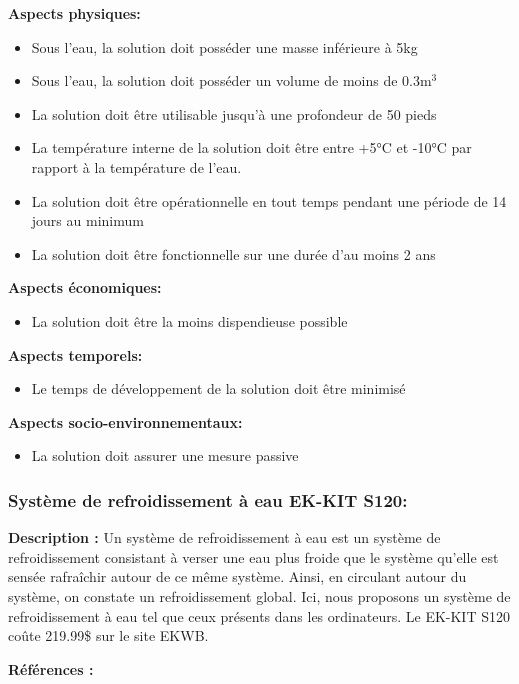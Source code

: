 \textbf{Aspects physiques:}
\begin{itemize}[label = {--}]
    \item Sous l'eau, la solution doit posséder une masse inférieure à 5kg
    \item Sous l'eau, la solution doit posséder un volume de moins de 0.3m$^3$
    \item La solution doit être utilisable jusqu'à une profondeur de 50 pieds
    \item La température interne de la solution doit être entre +5°C et -10°C par rapport à la température de l'eau.
    \item La solution doit être opérationnelle en tout temps pendant une période de 14 jours au minimum
    \item La solution doit être fonctionnelle sur une durée d'au moins 2 ans
\end{itemize}

\textbf{Aspects économiques:}
\begin{itemize}[label = {--}]
    \item La solution doit être la moins dispendieuse possible
\end{itemize}

\textbf{Aspects temporels:}
\begin{itemize}[label = {--}]
    \item Le temps de développement de la solution doit être minimisé
\end{itemize}

\textbf{Aspects socio-environnementaux:}
\begin{itemize}[label = {--}]
    \item La solution doit assurer une mesure passive
\end{itemize}

\subsubsection{Système de refroidissement à eau EK-KIT S120:}

\textbf{Description :} Un système de refroidissement à eau est un système de refroidissement consistant à verser une eau plus froide que le système qu'elle est sensée rafraîchir autour de ce même système. Ainsi, en circulant autour du système, on constate un refroidissement global. Ici, nous proposons un système de refroidissement à eau tel que ceux présents dans les ordinateurs. Le EK-KIT S120 coûte 219.99\$ sur le site EKWB.

\textbf{Références :} \cite{eau1} \cite{eau2}

